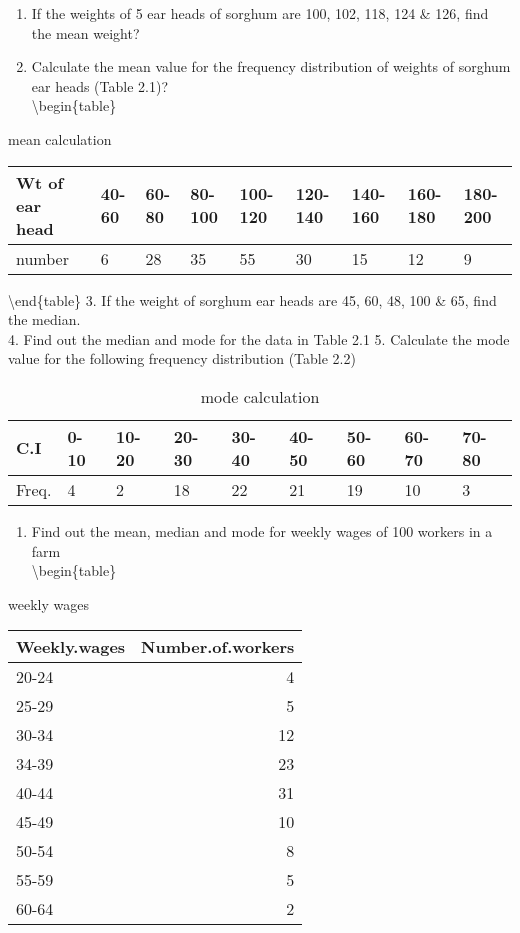 \documentclass[
]{book}
\providecommand{\tightlist}{%
  \setlength{\itemsep}{0pt}\setlength{\parskip}{0pt}}
\begin{document}
\begin{enumerate}
\def\labelenumi{\arabic{enumi}.}
\item
  If the weights of 5 ear heads of sorghum are 100, 102, 118, 124 \& 126, find the mean weight?
\item
  Calculate the mean value for the frequency distribution of weights of sorghum ear heads (Table 2.1)?\\
  \textbackslash begin\{table\}
\end{enumerate}

\caption{\label{tab:t1}mean calculation}
\centering
\begin{tabular}[t]{l|l|l|l|l|l|l|l|l}
\hline
Wt of ear head & 40-60 & 60-80 & 80-100 & 100-120 & 120-140 & 140-160 & 160-180 & 180-200\\
\hline
number & 6 & 28 & 35 & 55 & 30 & 15 & 12 & 9\\
\hline
\end{tabular}

\textbackslash end\{table\}
3. If the weight of sorghum ear heads are 45, 60, 48, 100 \& 65, find the median.\\
4. Find out the median and mode for the data in Table 2.1
5. Calculate the mode value for the following frequency distribution (Table 2.2)

\begin{table}

\caption{\label{tab:t2}mode calculation}
\centering
\begin{tabular}[t]{l|l|l|l|l|l|l|l|l}
\hline
C.I & 0-10 & 10-20 & 20-30 & 30-40 & 40-50 & 50-60 & 60-70 & 70-80\\
\hline
Freq. & 4 & 2 & 18 & 22 & 21 & 19 & 10 & 3\\
\hline
\end{tabular}
\end{table}

\begin{enumerate}
\def\labelenumi{\arabic{enumi}.}
\setcounter{enumi}{5}
\tightlist
\item
  Find out the mean, median and mode for weekly wages of 100 workers in a farm\\
  \textbackslash begin\{table\}
\end{enumerate}

\caption{\label{tab:t3}weekly wages}
\centering
\begin{tabular}[t]{l|r}
\hline
Weekly.wages & Number.of.workers\\
\hline
20-24 & 4\\
\hline
25-29 & 5\\
\hline
30-34 & 12\\
\hline
34-39 & 23\\
\hline
40-44 & 31\\
\hline
45-49 & 10\\
\hline
50-54 & 8\\
\hline
55-59 & 5\\
\hline
60-64 & 2\\
\hline
\end{tabular}
\end{document}
